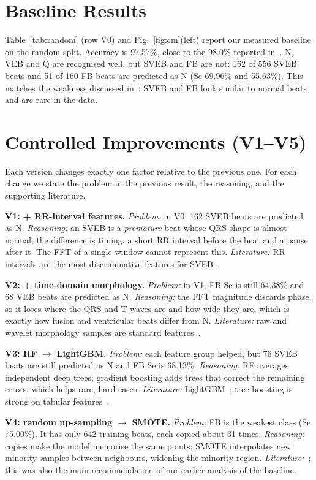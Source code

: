 \documentclass[journal]{IEEEtran}
\begin{document}
\section{Baseline Results}\label{sec:base}
Table~\ref{tab:random} (row V0) and Fig.~\ref{fig:cm}(left) report our measured baseline on the random split. Accuracy is 97.57\%, close to the 98.0\% reported in~\cite{subba2024}. N, VEB and Q are recognised well, but SVEB and FB are not: 162 of 556 SVEB beats and 51 of 160 FB beats are predicted as N (Se 69.96\% and 55.63\%). This matches the weakness discussed in~\cite{subba2024}: SVEB and FB look similar to normal beats and are rare in the data.

\section{Controlled Improvements (V1--V5)}\label{sec:improve}
Each version changes exactly one factor relative to the previous one. For each change we state the problem in the previous result, the reasoning, and the supporting literature.

\textbf{V1: + RR-interval features.} \emph{Problem:} in V0, 162 SVEB beats are predicted as N. \emph{Reasoning:} an SVEB is a \emph{premature} beat whose QRS shape is almost normal; the difference is timing, a short RR interval before the beat and a pause after it. The FFT of a single window cannot represent this. \emph{Literature:} RR intervals are the most discriminative features for SVEB~\cite{dechazal2004,mondejar2019}.

\textbf{V2: + time-domain morphology.} \emph{Problem:} in V1, FB Se is still 64.38\% and 68 VEB beats are predicted as N. \emph{Reasoning:} the FFT magnitude discards phase, so it loses where the QRS and T waves are and how wide they are, which is exactly how fusion and ventricular beats differ from N. \emph{Literature:} raw and wavelet morphology samples are standard features~\cite{dechazal2004,mondejar2019}.

\textbf{V3: RF $\rightarrow$ LightGBM.} \emph{Problem:} each feature group helped, but 76 SVEB beats are still predicted as N and FB Se is 68.13\%. \emph{Reasoning:} RF averages independent deep trees; gradient boosting adds trees that correct the remaining errors, which helps rare, hard cases. \emph{Literature:} LightGBM~\cite{ke2017}; tree boosting is strong on tabular features~\cite{grinsztajn2022}.

\textbf{V4: random up-sampling $\rightarrow$ SMOTE.} \emph{Problem:} FB is the weakest class (Se 75.00\%). It has only 642 training beats, each copied about 31 times. \emph{Reasoning:} copies make the model memorise the same points; SMOTE interpolates new minority samples between neighbours, widening the minority region. \emph{Literature:}~\cite{chawla2002}; this was also the main recommendation of our earlier analysis of the baseline.
\end{document}
